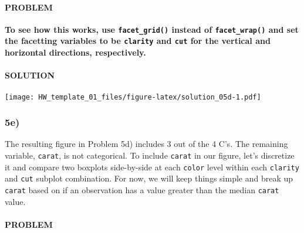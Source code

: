 \documentclass[]{article}
\newenvironment{Shaded}{\begin{snugshade}}{\end{snugshade}}
\newcommand{\DataTypeTok}[1]{\textcolor[rgb]{0.13,0.29,0.53}{#1}}
\newcommand{\KeywordTok}[1]{\textcolor[rgb]{0.13,0.29,0.53}{\textbf{#1}}}
\newcommand{\NormalTok}[1]{#1}
\newcommand{\OperatorTok}[1]{\textcolor[rgb]{0.81,0.36,0.00}{\textbf{#1}}}
\newcommand{\StringTok}[1]{\textcolor[rgb]{0.31,0.60,0.02}{#1}}
\let\oldparagraph\paragraph
\renewcommand{\paragraph}[1]{\oldparagraph{#1}\mbox{}}
\begin{document}
\hypertarget{problem-27}{%
\paragraph{PROBLEM}\label{problem-27}}

\textbf{To see how this works, use \texttt{facet\_grid()} instead of
\texttt{facet\_wrap()} and set the facetting variables to be
\texttt{clarity} and \texttt{cut} for the vertical and horizontal
directions, respectively.}

\hypertarget{solution-26}{%
\paragraph{SOLUTION}\label{solution-26}}

\begin{Shaded}
\end{Shaded}

\texttt{[image: HW\_template\_01\_files/figure-latex/solution\_05d-1.pdf]}

\hypertarget{e-4}{%
\subsubsection{5e)}\label{e-4}}

The resulting figure in Problem 5d) includes 3 out of the 4 C's. The
remaining variable, \texttt{carat}, is not categorical. To include
\texttt{carat} in our figure, let's discretize it and compare two
boxplots side-by-side at each \texttt{color} level within each
\texttt{clarity} and \texttt{cut} subplot combination. For now, we will
keep things simple and break up \texttt{carat} based on if an
observation has a value greater than the median \texttt{carat} value.

\hypertarget{problem-28}{%
\paragraph{PROBLEM}\label{problem-28}}
\end{document}
